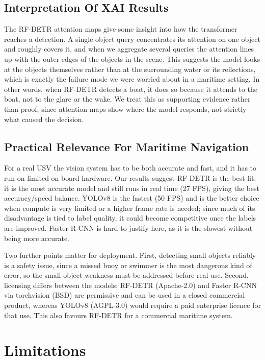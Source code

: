 \documentclass[11pt,a4paper]{article}
\begin{document}
\subsection{Interpretation Of XAI Results}
\label{sec:xai_discussion}
The RF-DETR attention maps give some insight into how the transformer reaches a
detection. A single object query concentrates its attention on one object and
roughly covers it, and when we aggregate several queries the attention lines up
with the outer edges of the objects in the scene. This suggests the model looks at
the objects themselves rather than at the surrounding water or its reflections,
which is exactly the failure mode we were worried about in a maritime setting. In
other words, when RF-DETR detects a boat, it does so because it attends to the
boat, not to the glare or the wake. We treat this as supporting evidence rather
than proof, since attention maps show where the model responds, not strictly what
caused the decision.

\subsection{Practical Relevance For Maritime Navigation}
For a real USV the vision system has to be both accurate and fast, and it has to
run on limited on-board hardware. Our results suggest RF-DETR is the best fit: it
is the most accurate model and still runs in real time (27 FPS), giving the best
accuracy/speed balance. YOLOv8 is the fastest (50 FPS) and is the better choice
when compute is very limited or a higher frame rate is needed; since much of its
disadvantage is tied to label quality, it could become competitive once the labels
are improved. Faster R-CNN is hard to justify here, as it is the slowest without
being more accurate.

Two further points matter for deployment. First, detecting small objects reliably
is a safety issue, since a missed buoy or swimmer is the most dangerous kind of
error, so the small-object weakness must be addressed before real use. Second,
licensing differs between the models: RF-DETR (Apache-2.0) and Faster R-CNN via
torchvision (BSD) are permissive and can be used in a closed commercial product,
whereas YOLOv8 (AGPL-3.0) would require a paid enterprise licence for that use.
This also favours RF-DETR for a commercial maritime system.

\section{Limitations}
\end{document}
